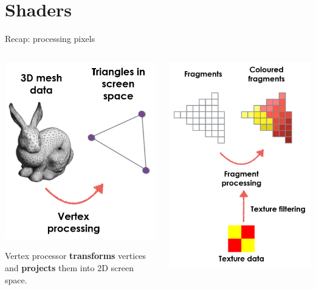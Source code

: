 \part{Shaders}
\frame{\partpage}

\begin{frame}{Recap: processing pixels}
	\begin{columns}
		\begin{column}{0.5\textwidth}
			\begin{center}
				\pause\includegraphics[height=0.85\textwidth]{vertex_processing}\\
			\end{center}
			Vertex processor \textbf{transforms} vertices and \textbf{projects} them into 2D screen space.
		\end{column}
		\begin{column}{0.5\textwidth}
			\begin{center}
				\pause\includegraphics[height=0.85\textwidth]{fragment_processing}\\

\end{center}
\end{column}
\end{columns}
\end{frame}
